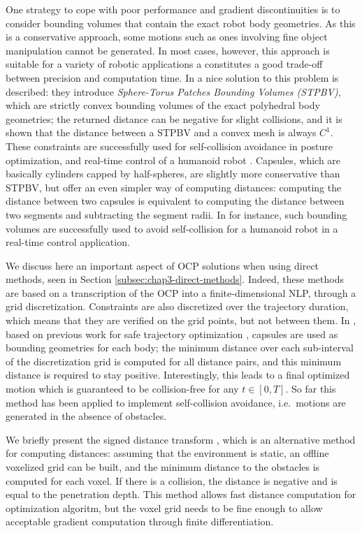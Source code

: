 One strategy to cope with poor performance and gradient
discontinuities is to consider bounding volumes that contain the exact
robot body geometries. As this is a conservative approach, some
motions such as ones involving fine object manipulation cannot be
generated. In most cases, however, this approach is suitable for a
variety of robotic applications a constitutes a good trade-off between
precision and computation time. In \cite{Escande2007} a nice solution
to this problem is described: they introduce \emph{Sphere-Torus
  Patches Bounding Volumes (STPBV)}, which are strictly convex
bounding volumes of the exact polyhedral body geometries; the returned
distance can be negative for slight collisions, and it is shown that
the distance between a STPBV and a convex mesh is always $C^1$. These
constraints are successfully used for self-collision avoidance in
posture optimization, and real-time control of a humanoid robot
\cite{Stasse2008}. Capsules, which are basically cylinders capped by
half-spheres, are slightly more conservative than STPBV, but offer an
even simpler way of computing distances: computing the distance
between two capsules is equivalent to computing the distance between
two segments and subtracting the segment radii. In \cite{Kanoun2011}
for instance, such bounding volumes are successfully used to avoid
self-collision for a humanoid robot in a real-time control
application.

We discuss here an important aspect of OCP solutions when using direct
methods, seen in Section \ref{subsec:chap3-direct-methods}. Indeed,
these methods are based on a transcription of the OCP into a
finite-dimensional NLP, through a grid discretization. Constraints are
also discretized over the trajectory duration, which means that they
are verified on the grid points, but not between them. In
\cite{lee2012accurate}, based on previous work for safe trajectory
optimization \cite{lengagne2013generation}, capsules are used as
bounding geometries for each body; the minimum distance over each
sub-interval of the discretization grid is computed for all distance
pairs, and this minimum distance is required to stay
positive. Interestingly, this leads to a final optimized motion which
is guaranteed to be collision-free for any $t\in[0,T]$. So far this
method has been applied to implement self-collision avoidance,
i.e.\ motions are generated in the absence of obstacles.

We briefly present the signed distance transform
\cite{felzenszwalb2004distance}, which is an alternative method for
computing distances: assuming that the environment is static, an
offline voxelized grid can be built, and the minimum distance to the
obstacles is computed for each voxel. If there is a collision, the
distance is negative and is equal to the penetration depth. This
method allows fast distance computation for optimization algoritm, but
the voxel grid needs to be fine enough to allow acceptable gradient
computation through finite differentiation.

